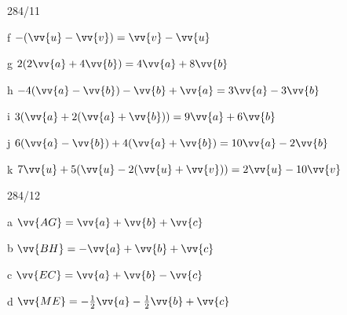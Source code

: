 \begin{exercise}{284/11}
  \item [f] $-(\vv{u} - \vv{v}) = \vv{v} - \vv{u}$
  \item [g] $2(2\vv{a} + 4\vv{b}) = 4\vv{a} + 8\vv{b}$
  \item [h] $-4(\vv{a} - \vv{b}) - \vv{b} + \vv{a} = 3\vv{a} - 3\vv{b}$
  \item [i] $3(\vv{a} + 2(\vv{a} + \vv{b})) = 9\vv{a} + 6\vv{b}$
  \item [j] $6(\vv{a} - \vv{b}) + 4(\vv{a} + \vv{b}) = 10\vv{a} - 2\vv{b}$
  \item [k] $7\vv{u} + 5(\vv{u} - 2(\vv{u} + \vv{v})) = 2\vv{u} - 10\vv{v}$
\end{exercise}
\begin{exercise}{284/12}
  \item [a] $\vv{AG} = \vv{a} + \vv{b} + \vv{c}$
  \item [b] $\vv{BH} = -\vv{a} + \vv{b} + \vv{c}$
  \item [c] $\vv{EC} = \vv{a} + \vv{b} - \vv{c}$
  \item [d] $\vv{ME} = -\frac{1}{2}\vv{a} - \frac{1}{2}\vv{b} + \vv{c}$
\end{exercise}



